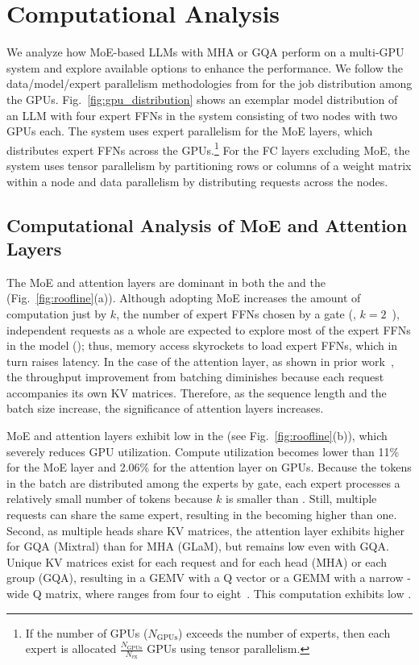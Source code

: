 \section{Computational Analysis}
\label{sec:motivaiton}

We analyze how MoE-based LLMs with MHA or GQA perform on a multi-GPU system and explore available options to enhance the performance.
We follow the data/model/expert parallelism methodologies from \cite{icml-2022-DSMoE} for the job distribution among the GPUs.
Fig.~\ref{fig:gpu_distribution} shows an exemplar model distribution of an LLM with four expert FFNs in the system consisting of two nodes with two GPUs each.
The system uses expert parallelism for the MoE layers, which distributes expert FFNs across the GPUs.\footnote{If the number of GPUs ($N_{\text{GPUs}}$) exceeds the number of experts, then each expert is allocated \(\frac{N_{\text{GPUs}}}{N_{\text{ex}}}\) GPUs using tensor parallelism.}
For the FC layers excluding MoE, the system uses tensor parallelism by partitioning rows or columns of a weight matrix within a node and data parallelism by distributing requests across the nodes.


\subsection{Computational Analysis of MoE and Attention Layers}
\label{sec:motivation:compute_analysis}

The MoE and attention layers are dominant in both the \deconlystage and the \mixedstage (Fig.~\ref{fig:roofline}(a)).
Although adopting MoE increases the amount of computation just by $k$, the number of expert FFNs chosen by a gate (\eg, $k=2$~\cite{icml-2022-GLaM, arxiv-2024-mixtral, grok1}), independent requests as a whole are expected to explore most of the expert FFNs in the model (\Numex);
thus, memory access skyrockets to load \Numex expert FFNs, which in turn raises latency.
In the case of the attention layer, as shown in prior work~\cite{asplos-2024-attacc}, the throughput improvement from batching diminishes because each request accompanies its own KV matrices.
Therefore, as the sequence length and the batch size increase, the significance of attention layers increases.

MoE and attention layers exhibit low \opb in the \deconlystage (see Fig.~\ref{fig:roofline}(b)), which severely reduces GPU utilization.
Compute utilization becomes lower than 11\% for the MoE layer and 2.06\% for the attention layer on GPUs.
Because the tokens in the batch are distributed among the experts by gate, each expert processes a relatively small number of tokens because $k$ is smaller than \Numex.
Still, multiple requests can share the same expert, resulting in the \opb becoming higher than one.
Second, as multiple heads share KV matrices, the attention layer exhibits higher \opb for GQA (Mixtral) than for MHA (GLaM), but \opb remains low even with GQA.
Unique KV matrices exist for each request and for each head (MHA) or each group (GQA), resulting in a GEMV with a Q vector or a GEMM with a narrow \deggrp-wide Q matrix, where \deggrp ranges from four to eight~\cite{arxiv-2024-mixtral, grok1, arxiv-2023-llama2}.
This computation exhibits low \opb.


